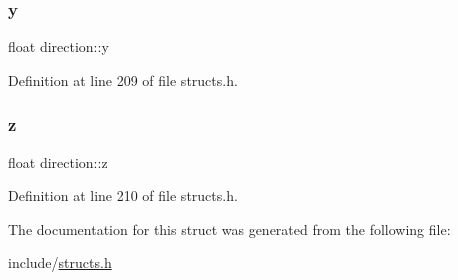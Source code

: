\subsubsection{\texorpdfstring{y}{y}}
{\footnotesize\ttfamily float direction\+::y}



Definition at line 209 of file structs.\+h.

\mbox{\label{structdirection_a417fbafba9a383aaf1bb843e540c5f95}} 
\subsubsection{\texorpdfstring{z}{z}}
{\footnotesize\ttfamily float direction\+::z}



Definition at line 210 of file structs.\+h.



The documentation for this struct was generated from the following file\+:\begin{DoxyCompactItemize}
\item 
include/\mbox{\hyperlink{structs_8h}{structs.\+h}}\end{DoxyCompactItemize}
